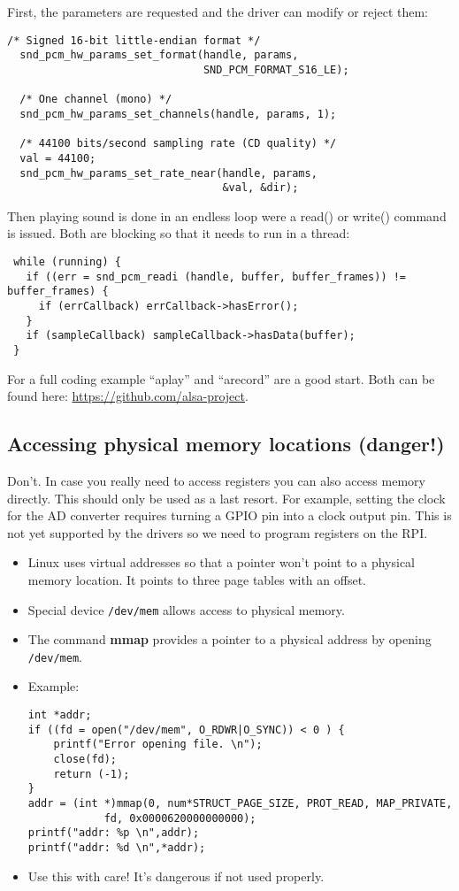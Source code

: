 \documentclass[12pt]{report}
\begin{document}
First, the parameters are requested and the driver can modify or
reject them:
\begin{verbatim}
/* Signed 16-bit little-endian format */
  snd_pcm_hw_params_set_format(handle, params,
                               SND_PCM_FORMAT_S16_LE);

  /* One channel (mono) */
  snd_pcm_hw_params_set_channels(handle, params, 1);

  /* 44100 bits/second sampling rate (CD quality) */
  val = 44100;
  snd_pcm_hw_params_set_rate_near(handle, params,
                                  &val, &dir);
\end{verbatim}

Then playing sound is done in an endless loop were a read()
or write() command is issued. Both are blocking so that
it needs to run in a thread:

\begin{verbatim}
 while (running) {
   if ((err = snd_pcm_readi (handle, buffer, buffer_frames)) != buffer_frames) {
     if (errCallback) errCallback->hasError();
   }
   if (sampleCallback) sampleCallback->hasData(buffer);
 }
\end{verbatim}

For a full coding example ``aplay'' and ``arecord'' are a good start.
Both can be found here:
\url{https://github.com/alsa-project}.




\subsection{Accessing physical memory locations (danger!)}

Don't.
In case you really need to access registers you can
also access memory directly. This should only be used as a last resort.
For example, setting the clock for the AD converter requires
turning a GPIO pin into a clock output pin. This is not yet
supported by the drivers so we need to program registers
on the RPI.
\begin{itemize}
\item Linux uses virtual addresses so that a pointer won't
point to a physical memory location. It points to three page
tables with an offset.
\item Special device \texttt{/dev/mem} allows access to physical
memory.
\item The command \textbf{mmap} provides a pointer to a physical
address by opening \texttt{/dev/mem}.
\item Example:
\begin{verbatim}
int *addr;
if ((fd = open("/dev/mem", O_RDWR|O_SYNC)) < 0 ) {
    printf("Error opening file. \n");
    close(fd);
    return (-1);
}
addr = (int *)mmap(0, num*STRUCT_PAGE_SIZE, PROT_READ, MAP_PRIVATE,
            fd, 0x0000620000000000);
printf("addr: %p \n",addr);
printf("addr: %d \n",*addr);
\end{verbatim}
\item Use this with care! It's dangerous if not used properly.
\end{itemize}
\end{document}

